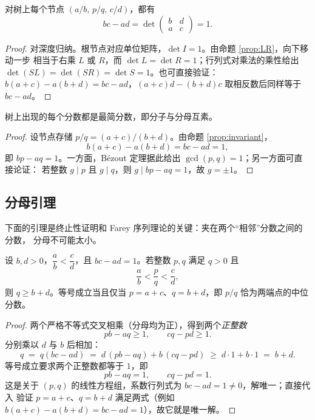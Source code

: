 \begin{proposition}[行列式不变量]\label{prop:invariant}
对树上每个节点 $(a/b,\,p/q,\,c/d)$，都有
\[
  bc-ad=\det\begin{pmatrix}b&d\\ a&c\end{pmatrix}=1.
\]
\end{proposition}

\begin{proof}
对深度归纳。根节点对应单位矩阵，$\det I=1$。由命题 \ref{prop:LR}，向下移动一步
相当于右乘 $L$ 或 $R$，而 $\det L=\det R=1$；行列式对乘法的乘性给出
$\det(SL)=\det(SR)=\det S=1$。也可直接验证：
$b(a+c)-a(b+d)=bc-ad$，$(a+c)d-(b+d)c$ 取相反数后同样等于 $bc-ad$。
\end{proof}

\begin{corollary}[最简性]\label{cor:reduced}
树上出现的每个分数都是最简分数，即分子与分母互素。
\end{corollary}

\begin{proof}
设节点存储 $p/q=(a+c)/(b+d)$。由命题 \ref{prop:invariant}，
\[
  b(a+c)-a(b+d)=bc-ad=1,
\]
即 $bp-aq=1$。一方面，B\'ezout 定理据此给出 $\gcd(p,q)=1$；另一方面可直接论证：
若整数 $g\mid p$ 且 $g\mid q$，则 $g\mid bp-aq=1$，故 $g=\pm1$。
\end{proof}

\subsection{分母引理}

下面的引理是终止性证明和 Farey 序列理论的关键：夹在两个``相邻''分数之间的分数，
分母不可能太小。

\begin{lemma}[分母引理]\label{lem:denominator}
设 $b,d>0$，$\dfrac ab<\dfrac cd$，且 $bc-ad=1$。若整数 $p,q$ 满足 $q>0$ 且
\[
  \frac ab<\frac pq<\frac cd,
\]
则 $q\ge b+d$。等号成立当且仅当 $p=a+c$、$q=b+d$，即 $p/q$ 恰为两端点的中位分数。
\end{lemma}

\begin{proof}
两个严格不等式交叉相乘（分母均为正），得到两个\emph{正整数}
\[
  pb-aq\ge 1,\qquad cq-pd\ge 1.
\]
分别乘以 $d$ 与 $b$ 后相加：
\[
  q\;=\;q(bc-ad)\;=\;d\,(pb-aq)+b\,(cq-pd)\;\ge\; d\cdot 1+b\cdot 1\;=\;b+d.
\]
等号成立要求两个正整数都等于 $1$，即
\[
  pb-aq=1,\qquad cq-pd=1.
\]
这是关于 $(p,q)$ 的线性方程组，系数行列式为 $bc-ad=1\ne0$，解唯一；直接代入
验证 $p=a+c$、$q=b+d$ 满足两式（例如 $b(a+c)-a(b+d)=bc-ad=1$），故它就是唯一解。
\end{proof}

